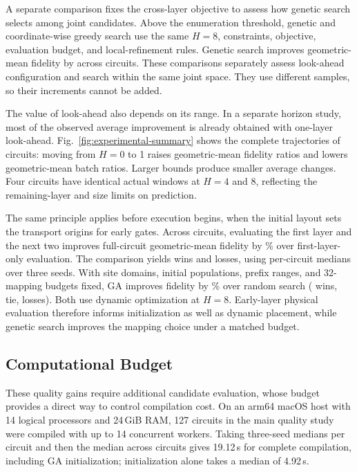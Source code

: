 A separate comparison fixes the cross-layer objective to assess how genetic search selects among joint candidates. Above the enumeration threshold, genetic and coordinate-wise greedy search use the same $H=8$, constraints, objective, evaluation budget, and local-refinement rules. Genetic search improves geometric-mean fidelity by  across \AblationGAN{} circuits. These comparisons separately assess look-ahead configuration and search within the same joint space. They use different samples, so their increments cannot be added.

\label{sec:horizon-evaluation}
The value of look-ahead also depends on its range. In a separate horizon study, most of the observed average improvement is already obtained with one-layer look-ahead. Fig.~\ref{fig:experimental-summary} shows the complete trajectories of \HorizonExtCompleteN{} circuits: moving from $H=0$ to 1 raises geometric-mean fidelity ratios and lowers geometric-mean batch ratios. Larger bounds produce smaller average changes. Four circuits have identical actual windows at $H=4$ and 8, reflecting the remaining-layer and size limits on prediction.



\label{sec:init-evaluation}
The same principle applies before execution begins, when the initial layout sets the transport origins for early gates. Across \PhysicalInitSearchCompleteN{} circuits, evaluating the first layer and the next two improves full-circuit geometric-mean fidelity by \PhysicalInitGaVsHZeroGainPercent\% over first-layer-only evaluation. The comparison yields \PhysicalInitGaVsHZeroWins{} wins and \PhysicalInitGaVsHZeroLosses{} losses, using per-circuit medians over three seeds. With site domains, initial populations, prefix ranges, and 32-mapping budgets fixed, GA improves fidelity by \PhysicalInitGaVsRandomGainPercent\% over random search (\PhysicalInitGaVsRandomWins{} wins, \PhysicalInitGaVsRandomTies{} tie, \PhysicalInitGaVsRandomLosses{} losses). Both use dynamic optimization at $H=8$. Early-layer physical evaluation therefore informs initialization as well as dynamic placement, while genetic search improves the mapping choice under a matched budget.

\subsection{Computational Budget}
\label{sec:runtime-evaluation}

These quality gains require additional candidate evaluation, whose budget provides a direct way to control compilation cost. On an arm64 macOS host with 14 logical processors and 24\,GiB RAM, 127 circuits in the main quality study were compiled with up to 14 concurrent workers. Taking three-seed medians per circuit and then the median across circuits gives 19.12\,s for complete compilation, including GA initialization; initialization alone takes a median of 4.92\,s.


